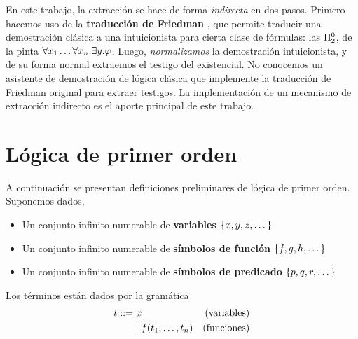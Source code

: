 En este trabajo, la extracción se hace de forma \textit{indirecta} en dos pasos.
Primero hacemos uso de la \textbf{traducción de Friedman}
\cite{miquel-friedman}, que permite traducir una demostración clásica a una
intuicionista para cierta clase de fórmulas: las $\Pi^0_{2}$, de la pinta
$\forall x_1 \dots \forall x_n . \exists y . \varphi$. Luego,
\textit{normalizamos} la demostración intuicionista, y de su forma normal
extraemos el testigo del existencial. No conocemos un asistente de demostración
de lógica clásica que implemente la traducción de Friedman original para extraer
testigos. La implementación de un mecanismo de extracción indirecto es el aporte principal de este trabajo.

\section{Lógica de primer orden}

A continuación se presentan definiciones preliminares de lógica de primer orden. Suponemos dados,

\begin{itemize}
    \item Un conjunto infinito numerable de \textbf{variables}
    \(
        \{x, y, z, \dots\}
    \)
    \item Un conjunto infinito numerable de \textbf{símbolos de función}
    \(
        \{f, g, h, \dots\}
    \)
    \item Un conjunto infinito numerable de \textbf{símbolos de predicado}
    \(
        \{p, q, r, \dots\}
    \)
\end{itemize}

\begin{definition}[Términos]
    Los términos están dados por la gramática
    \begin{align*}
        \term ::= &\ \var                               &\text{(variables)} \\
                  & \mid \fun(\term_1, \dots, \term_n) &\text{(funciones)}
    \end{align*}
\end{definition}

